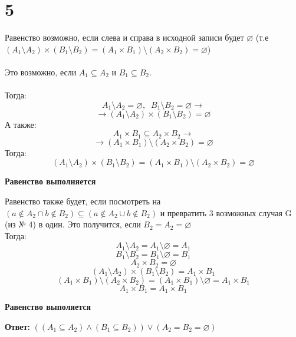 \documentclass[a4paper,12pt]{article}
\begin{document}
\section*{5}
Равенство возможно, если слева и справа в исходной записи будет $\varnothing$ (т.е $(A_1 \setminus A_2) \times (B_1 \setminus B_2) =(A_1 \times B_1) \setminus (A_2 \times B_2)  = \varnothing$)
\\\\
Это возможно, если $A_1 \subseteq A_2$ и  $B_1 \subseteq B_2$. 
\\\\Тогда:
\[
A_1 \setminus A_2 = \varnothing, \; \; 
B_1 \setminus B_2 = \varnothing \rightarrow
\]
\[
\rightarrow  (A_1 \setminus A_2) \times (B_1 \setminus B_2) = \varnothing
\]
А также:
\[
A_1 \times B_1 \subseteq A_2 \times B_2 \rightarrow
\]
\[
\rightarrow (A_1 \times B_1) \setminus (A_2 \times B_2) = \varnothing
\]
Тогда:
\[
(A_1 \setminus A_2) \times (B_1 \setminus B_2) =(A_1 \times B_1) \setminus (A_2 \times B_2)  = \varnothing
\]
\begin{center}
\textbf{Равенство выполняется}
\end{center}
Равенство также будет, если посмотреть на $(a \notin A_2 \cap b \notin B_2) \subseteq (a \notin A_2 \cup b \notin B_2)$ и превратить 3 возможных случая G (из № 4) в один. Это получится, если $B_2 = A_2 = \varnothing$ \\
Тогда:
\[
A_1 \setminus A_2 = A_1 \setminus \varnothing = A_1
\]
\[
B_1 \setminus B_2 = B_1 \setminus \varnothing = B_1
\]
\[
A_2 \times B_2 = \varnothing
\]
\[
(A_1 \setminus A_2) \times (B_1 \setminus B_2) = A_1 \times B_1
\]
\[
(A_1 \times B_1) \setminus (A_2 \times B_2) = (A_1 \times B_1) \setminus \varnothing = A_1 \times B_1
\]
\[
A_1 \times B_1 = A_1 \times B_1
\]
\begin{center}
\textbf{Равенство выполяется}
\end{center}
\textbf{Ответ:} $ ((A_1 \subseteq A_2) \wedge (B_1 \subseteq B_2)) \vee (A_2 = B_2 = \varnothing)$
\end{document}
